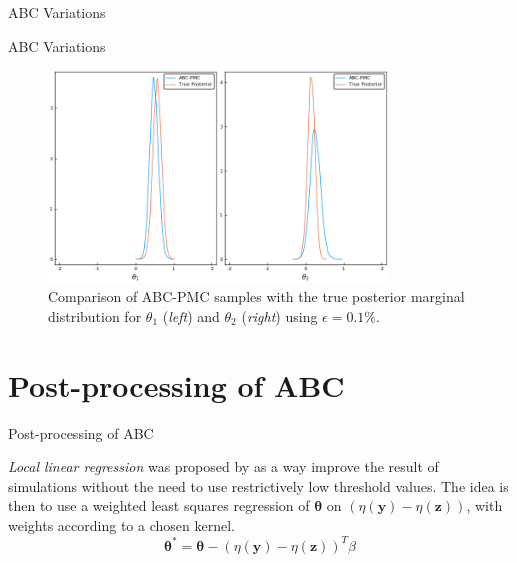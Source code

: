 \documentclass[10pt]{beamer}
\begin{document}
\begin{frame}[fragile]{ABC Variations}
  \footnotesize
  \begin{algorithm}[H]
  \SetAlgoLined


   \caption{ABC-PMC}
  \end{algorithm}

\end{frame}

\begin{frame}[fragile]{ABC Variations}

    \begin{figure}[H]
        \centering
        \includegraphics[width=9cm]{images/ABC-PMC.png}
        \caption{Comparison of ABC-PMC samples with the true posterior
        marginal distribution for $\theta_1$ (\textit{left}) and
        $\theta_2$ (\textit{right}) using $\epsilon = 0.1\%$.
        }
    \end{figure}

\end{frame}
\AtBeginSection{}
\section[Post-Processing of ABC]{Post-processing of ABC}
\begin{frame}[fragile]{Post-processing of ABC}
  
  \textit{Local linear regression} was proposed by
  \citet{Beaumont2012} as a way improve the result of simulations
  without the need to use restrictively low threshold values.
  The idea is then to use a weighted least squares regression
  of $\bm \theta$ on $(\eta(\bm y) - \eta(\bm z))$, with weights
  according to a chosen kernel.
  $$
  \bm \theta^* = \bm \theta - (\eta(\bm y) - \eta(\bm z))^T\hat\beta
  $$

\end{frame}
\end{document}
